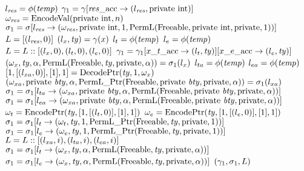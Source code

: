 \begin{algorithm*}\footnotesize
\caption{$(\gamma_1, \sigma_1, \locL) \gets \Initialize(\x_{\vl},\ \gamma, \sigma, n, \Acc)$}
\label{algo: initialize}
\begin{algorithmic}
	\STATE $l_{\mathit{res}} = \phi(\mathit{temp})$
	\STATE $\gamma_1 = \gamma[\mathit{res}\_\mathrm{acc} \to (l_{\mathit{res}}, \mathrm{private}\ \mathrm{int})]$
	\STATE $\omega_{\mathit{res}} = \mathrm{EncodeVal}(\mathrm{private}\ \mathrm{int}, n)$
	\STATE $\sigma_1 = \sigma[l_{\mathit{res}} \to (\omega_{\mathit{res}}, \mathrm{private}\ \mathrm{int}, 1, \mathrm{PermL}(\mathrm{Freeable}, \mathrm{private}\ \mathrm{int}, \mathrm{private}, 1))]$
	\STATE $L = [(l_{\mathit{res}}, 0)]$
	\FORALL{$\x \in \x_{\vl}$}
		\STATE $(l_x, \mathit{ty}) = \gamma(x)$	
		\STATE $l_t = \phi(\mathit{temp})$
		\STATE $l_e = \phi(\mathit{temp})$
		\STATE $L = L ::[(l_x, 0), (l_t, 0), (l_e, 0)]$
		\STATE $\gamma_1 = \gamma_1[x\_t\_\mathrm{acc} \to (l_t, \mathit{ty})][x\_e\_\mathrm{acc} \to (l_e, \mathit{ty})]$
		\STATE $(\omega_x, \mathit{ty}, \alpha, \mathrm{PermL}(\mathrm{Freeable}, \mathit{ty}, \mathrm{private}, \alpha)) = \sigma_1(l_x)$
		\IF{$(\Type = \Priv\ \Const\ \btype*)$} 
			\STATE $l_{ta} = \phi(\mathit{temp})$
			\STATE $l_{ea} = \phi(\mathit{temp})$
			\STATE $[1, [(l_{xa}, 0)], [1], 1] = \mathrm{DecodePtr}(\mathit{ty}, 1, \omega_{x})$
			\STATE $(\byte_{xa}, \Priv\ \btype, \nl, \PtrPermL(\PermF, \Priv\ \btype, \Priv, \nl)) = \sigma_1(\loc_{xa})$
			\STATE $\sigma_1 = \sigma_1[l_{ta} \to (\omega_{xa}, \mathrm{private}\ \mathit{bty}, \alpha, \mathrm{PermL}(\mathrm{Freeable}, \mathrm{private}\ \mathit{bty}, \mathrm{private}, \alpha))]$
			\STATE $\sigma_1 = \sigma_1[l_{ea} \to (\omega_{xa}, \mathrm{private}\ \mathit{bty}, \alpha, \mathrm{PermL}(\mathrm{Freeable}, \mathrm{private}\ \mathit{bty}, \mathrm{private}, \alpha))]$
			\STATE $\omega_{t} = \mathrm{EncodePtr}(\mathit{ty}, [1, [(l_{t}, 0)], [1], 1])$
			\STATE $\omega_{e} = \mathrm{EncodePtr}(\mathit{ty}, [1, [(l_{e}, 0)], [1], 1])$
			\STATE $\sigma_1 = \sigma_1[l_t \to (\omega_{t}, \mathit{ty}, 1, \mathrm{PermL}\_\mathrm{Ptr}(\mathrm{Freeable}, \mathit{ty}, \mathrm{private}, 1))]$
			\STATE $\sigma_1 = \sigma_1[l_e \to (\omega_{e}, \mathit{ty}, 1, \mathrm{PermL}\_\mathrm{Ptr}(\mathrm{Freeable}, \mathit{ty}, \mathrm{private}, 1))]$
				\STATE $L = L :: [(l_{xa}, i), (l_{ta}, i), (l_{ea}, i)]$
			\ENDFOR
		\ELSE
			\STATE $\sigma_1 = \sigma_1[l_t \to (\omega_x, \mathit{ty}, \alpha, \mathrm{PermL}(\mathrm{Freeable}, \mathit{ty}, \mathrm{private}, \alpha))]$
			\STATE $\sigma_1 = \sigma_1[l_e \to (\omega_x, \mathit{ty}, \alpha, \mathrm{PermL}(\mathrm{Freeable}, \mathit{ty}, \mathrm{private}, \alpha))]$
		\ENDIF
	\ENDFOR									
	\RETURN $(\gamma_1, \sigma_1, L)$
\end{algorithmic}
\end{algorithm*}





